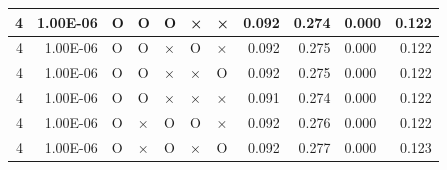 \documentclass[11pt]{article}
\begin{document}
\begin{longtable}[h]{|r|r|l|l|l|l|l|r|r|l|r|}
4                                 & 1.00E-06                         & O                                & O                                & O                                & ×                                & ×                                 & 0.092                             & 0.274                             & 0.000                              & 0.122                               \\ \hline
4                                 & 1.00E-06                         & O                                & O                                & ×                                & O                                & ×                                 & 0.092                             & 0.275                             & 0.000                              & 0.122                               \\ \hline
4                                 & 1.00E-06                         & O                                & O                                & ×                                & ×                                & O                                 & 0.092                             & 0.275                             & 0.000                              & 0.122                               \\ \hline
4                                 & 1.00E-06                         & O                                & O                                & ×                                & ×                                & ×                                 & 0.091                             & 0.274                             & 0.000                              & 0.122                               \\ \hline
4                                 & 1.00E-06                         & O                                & ×                                & O                                & O                                & ×                                 & 0.092                             & 0.276                             & 0.000                              & 0.122                               \\ \hline
4                                 & 1.00E-06                         & O                                & ×                                & O                                & ×                                & O                                 & 0.092                             & 0.277                             & 0.000                              & 0.123                               \\ \hline

\end{longtable}
\end{document}
